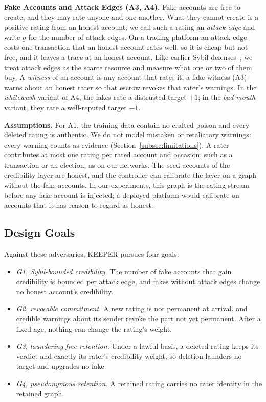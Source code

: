 \documentclass[lettersize,journal]{IEEEtran}
\begin{document}
\smallskip\noindent\textbf{Fake Accounts and Attack Edges (A3, A4).}
Fake accounts are free to create, and they may rate anyone and one another.
What they cannot create is a positive rating from an honest account; we call such a rating an \emph{attack edge} and write $g$ for the number of attack edges.
On a trading platform an attack edge costs one transaction that an honest account rates well, so it is cheap but not free, and it leaves a trace at an honest account.
Like earlier Sybil defenses~\cite{cao2012aiding,tran2009sybil}, we treat attack edges as the scarce resource and measure what one or two of them buy.
A \emph{witness} of an account is any account that rates it; a fake witness (A3) warns about an honest rater so that escrow revokes that rater's warnings.
In the \emph{whitewash} variant of A4, the fakes rate a distrusted target $+1$; in the \emph{bad-mouth} variant, they rate a well-reputed target $-1$.

\smallskip\noindent\textbf{Assumptions.}
For A1, the training data contain no crafted poison and every deleted rating is authentic.
We do not model mistaken or retaliatory warnings: every warning counts as evidence (Section~\ref{subsec:limitations}).
A rater contributes at most one rating per rated account and occasion, such as a transaction or an election, as on our networks.
The seed accounts of the credibility layer are honest, and the controller can calibrate the layer on a graph without the fake accounts. In our experiments, this graph is the rating stream before any fake account is injected; a deployed platform would calibrate on accounts that it has reason to regard as honest.

\subsection{Design Goals}
\label{subsec:design_goals}

Against these adversaries, KEEPER pursues four goals.
\begin{itemize}
  \item \emph{G1, Sybil-bounded credibility.} The number of fake accounts that gain credibility is bounded per attack edge, and fakes without attack edges change no honest account's credibility.
  \item \emph{G2, revocable commitment.} A new rating is not permanent at arrival, and credible warnings about its sender revoke the part not yet permanent. After a fixed age, nothing can change the rating's weight.
  \item \emph{G3, laundering-free retention.} Under a lawful basis, a deleted rating keeps its verdict and exactly its rater's credibility weight, so deletion launders no target and upgrades no fake.
  \item \emph{G4, pseudonymous retention.} A retained rating carries no rater identity in the retained graph.
\end{itemize}
\end{document}
